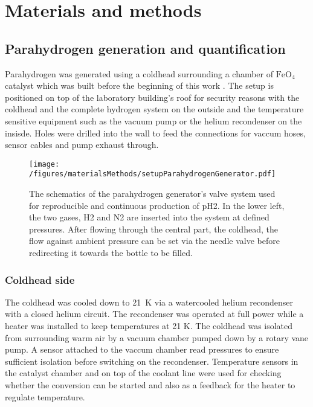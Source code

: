 \chapter{Materials and methods}\label{chap:MaterialsAndMethods}
    \section{Parahydrogen generation and quantification}
    Parahydrogen was generated using a coldhead surrounding a chamber of $\mathrm{FeO_4}$ catalyst which was built before the beginning of this work \cite{hovener_continuous-flow_2013}. The setup is positioned on top of the laboratory building's roof for security reasons with the coldhead and the complete hydrogen system on the outside and the temperature sensitive equipment such as the vacuum pump or the helium recondenser on the insisde. Holes were drilled into the wall to feed the connections for vaccum hoses, sensor cables and pump exhaust through.
    \begin{figure}
        \texttt{[image: /figures/materialsMethods/setupParahydrogenGenerator.pdf]}
        \caption[Parahydrogen generator scheme]{The schematics of the parahydrogen generator's valve system used for reproducible and continuous production of pH2. In the lower left, the two gases, H2 and N2 are inserted into the system at defined pressures. After flowing through the central part, the coldhead, the flow against ambient pressure can be set via the needle valve before redirecting it towards the bottle to be filled.}
        \label{figure:materialsMethods:pH2Generator}
    \end{figure}
        \subsection{Coldhead side}
            The coldhead was cooled down to \SI{21}{\kelvin} via a watercooled helium recondenser with a closed helium circuit. The recondenser was operated at full power while a heater was installed to keep temperatures at 21 K. The coldhead was isolated from surrounding warm air by a vacuum chamber pumped down by a rotary vane pump. A sensor attached to the vaccum chamber read pressures to ensure sufficient isolation before switching on the recondenser. Temperature sensors in the catalyst chamber and on top of the coolant line were used for checking whether the conversion can be started and also as a feedback for the heater to regulate temperature.
